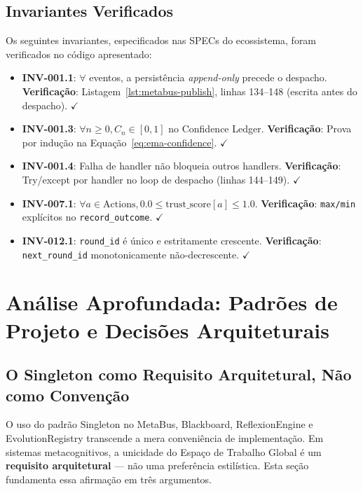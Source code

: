 \subsection{Invariantes Verificados}

Os seguintes invariantes, especificados nas SPECs do ecossistema, foram verificados no código apresentado:

\begin{itemize}
    \item \textbf{INV-001.1}: $\forall$ eventos, a persistência \textit{append-only} precede o despacho. \textbf{Verificação}: Listagem~\ref{lst:metabus-publish}, linhas 134--148 (escrita antes do despacho). $\checkmark$
    \item \textbf{INV-001.3}: $\forall n \geq 0, C_n \in [0, 1]$ no Confidence Ledger. \textbf{Verificação}: Prova por indução na Equação~\ref{eq:ema-confidence}. $\checkmark$
    \item \textbf{INV-001.4}: Falha de handler não bloqueia outros handlers. \textbf{Verificação}: Try/except por handler no loop de despacho (linhas 144--149). $\checkmark$
    \item \textbf{INV-007.1}: $\forall a \in \text{Actions}, 0.0 \leq \text{trust\_score}[a] \leq 1.0$. \textbf{Verificação}: \texttt{max/min} explícitos no \texttt{record\_outcome}. $\checkmark$
    \item \textbf{INV-012.1}: \texttt{round\_id} é único e estritamente crescente. \textbf{Verificação}: \texttt{next\_round\_id} monotonicamente não-decrescente. $\checkmark$
\end{itemize}

\section{Análise Aprofundada: Padrões de Projeto e Decisões Arquiteturais}
\label{sec:deep-analysis}

\subsection{O Singleton como Requisito Arquitetural, Não como Convenção}

O uso do padrão Singleton no MetaBus, Blackboard, ReflexionEngine e EvolutionRegistry transcende a mera conveniência de implementação. Em sistemas metacognitivos, a unicidade do Espaço de Trabalho Global é um \textbf{requisito arquitetural} — não uma preferência estilística. Esta seção fundamenta essa afirmação em três argumentos.

